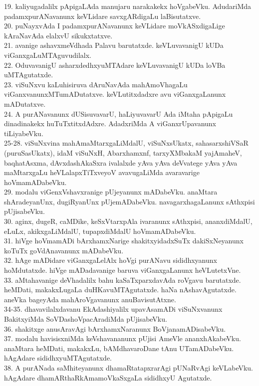 \documentclass{article}
\begin{document}
19. kaliyugadalilx pApigaLAda manujaru narakakekx hoVgabeVku. AdudariMda padamxpurANavanunx keVLidare savxgARdigaLu laBisutatxve.\\
20. puNayxvAda I padamxpurANavanunx keVLidare moVkASxdigaLige kAraNavAda elalxvU sikukxtatxve.\\
21. avanige ashavxmeVdhada Palavu barutatxde. keVLuvavanigU kUDa viGanxgaLuMTAguvudilalx.\\
22. OduvavanigU asharxdedhxyuMTAdare keVLuvavanigU kUDa loVBa uMTAgutatxde.\\
23. viSuNxvu kaLuhisiruva dAruNavAda mahAmoVhagaLu viGanxvanunxMTumADutatxve. keVLutitxdadxre avu viGanxgaLanunx mADutatxve.\\
24. A purANavanunx dUSisuvavarU, haLiyuvavarU Ada iMtaha pApigaLu dinadinakekx huTuTxtitxdAdxre. AdadxriMda A viGanxrUpavanunx tiLiyabeVku.\\
25-28. viSuNxvina mahAmaMtarxgaLiMdalU, viSuNxsUkatx, sahasarxshiVSaR (puruSasUkatx), idaM viSuNxH, Abarxhamxnf, tarxyXMbakaM yajAmaheV, baqhatAsxma, dAvxdashAkaSxra ivalalxde yAva yAva deVvatege yAva yAva maMtarxgaLu heVLalapxTiTxveyoV avavugaLiMda avaravarige hoVmamADabeVku.\\
29. modalu viGenxVshavxranige pUjeyanunx mADabeVku. anaMtara shAradeyanUnx, dugiRyanUnx pUjemADabeVku. navagarxhagaLanunx sAthxpisi pUjisabeVku.\\
30. aginx, dugeR, caMDike, keSxVtarxpAla ivaranunx sAthxpisi, ananxdiMdalU, eLuLx, akikxgaLiMdalU, tupapxdiMdalU hoVmamADabeVku.\\
31. hiVge hoVmamADi bArxhamxNarige shakitxyidadxSuTx dakiSxNeyanunx koTuTx goVdAnavanunx mADabeVku.\\
32. hAge mADidare viGanxgaLelAlx hoVgi purANavu sididhxyanunx hoMdutatxde. hiVge mADadavanige baruva viGanxgaLanunx heVLutetxVne.\\
33. aMtahavanige deVhadalilx bahu kaSaTxparxdavAda roVgavu barutatxde. heMDati, makakxLugaLa duHKavuMTAgutatxde. haNa nAshavAgutatxde. aneVka bageyAda mahAroVgavanunx anuBavisutAtxne.\\
34-35. dhavavilalxdavanu EkAdashiyalilx upavAsamADi viSuNxvanunx BakitxyiMda SoVDashoVpacAradiMda pUjisabeVku.\\
36. shakitxge anusAravAgi bArxhamxNaranunx BoVjanamADisabeVku.\\
37. modalu havisisxniMda keVshavananunx pUjisi AmeVle ananxhAkabeVku. anaMtara heMDati, makakxLu, bAMdhavaroDane tAnu UTamADabeVku. hAgAdare sididhxyuMTAgutatxde.\\
38. A purANada saMhiteyanunx dhamaRtatapxrarAgi pUNaRvAgi keVLabeVku. hAgAdare dhamARthaRkAmamoVkaSxgaLa sididhxyU Agutatxde.\\
\end{document}
